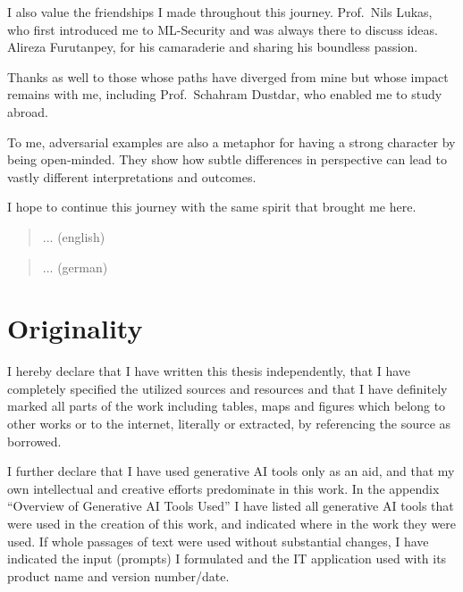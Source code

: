 \documentclass[a4paper, oneside]{discothesis}
\begin{document}
\begin{acknowledgements}
	I also value the friendships I made throughout this journey. Prof.\ Nils Lukas, who first introduced me to ML-Security and was always there to discuss ideas. Alireza Furutanpey, for his camaraderie and sharing his boundless passion.

	Thanks as well to those whose paths have diverged from mine but whose impact remains with me, including Prof.\ Schahram Dustdar, who enabled me to study abroad.

	To me, adversarial examples are also a metaphor for having a strong character by being open-minded. They show how subtle differences in perspective can lead to vastly different interpretations and outcomes.
	
	I hope to continue this journey with the same spirit that brought me here.
\end{acknowledgements}

\begin{abstract}
	... (english)
\end{abstract}

\begin{abstract}

	... (german)
\end{abstract}

\chapter*{Originality}

I hereby declare that I have written this thesis independently, that I have completely specified the utilized sources and resources and that I have definitely marked all parts of the work \textendash{} including tables, maps and figures \textendash{} which belong to other works or to the internet, literally or extracted, by referencing the source as borrowed.

I further declare that I have used generative AI tools only as an aid, and that my own intellectual and creative efforts predominate in this work. In the appendix ``Overview of Generative AI Tools Used'' I have listed all generative AI tools that were used in the creation of this work, and indicated where in the work they were used. If whole passages of text were used without substantial changes, I have indicated the input (prompts) I formulated and the IT application used with its product name and version number/date.
\end{document}
